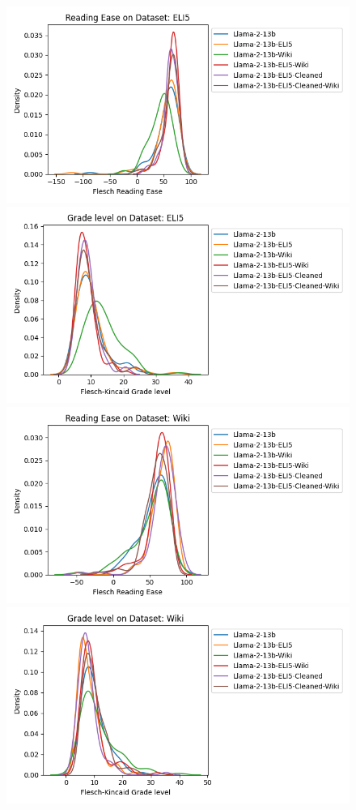 \documentclass[11pt, oneside]{article}   	%
\begin{document}
\begin{figure}
\includegraphics[scale=.5]{./figures/FRE_13B_ELI5.png}
\includegraphics[scale=.5]{./figures/FKG_13B_ELI5.png}
\\
\includegraphics[scale=.5]{./figures/FRE_13B_Wiki.png}
\includegraphics[scale=.5]{./figures/FKG_13B_Wiki.png}

\end{figure}
\end{document}
